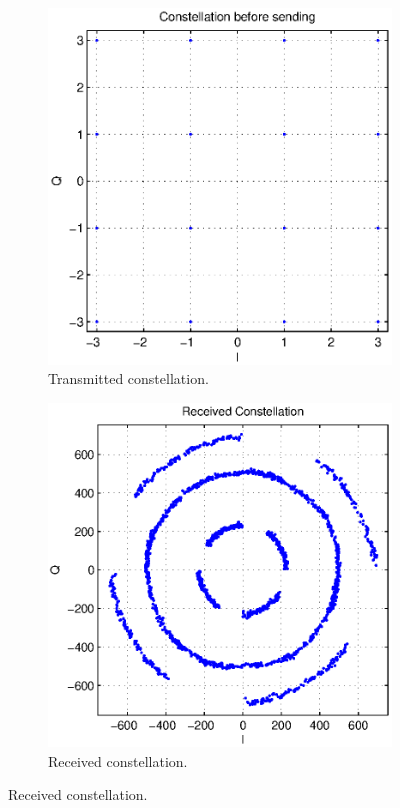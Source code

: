 \documentclass[12pt,a4paper,openright]{report}
\begin{document}
 \begin{figure}[H]
 \centering
\begin{subfigure}{0.32\textwidth}
 \centering
    \includegraphics[width=0.8\linewidth]{tx_const.eps}
    \caption{Transmitted constellation.}
    \label{fig:DPLL2}
\end{subfigure}%
\begin{subfigure}{0.32\textwidth}
 \centering
    \includegraphics[width=0.8\linewidth]{rx_const.eps}
    \caption{Received constellation.}
    \label{fig:PD2}
    \end{subfigure}

\end{figure}
\end{document}
